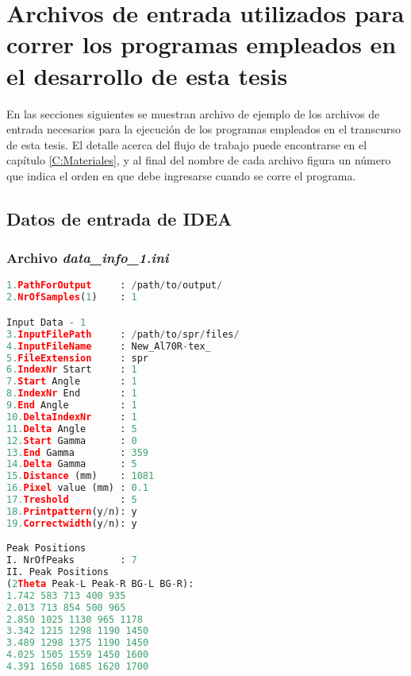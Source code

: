 \chapter{Archivos de entrada utilizados para correr los programas empleados en el desarrollo de esta tesis}\label{CA:input}
\graphicspath{{figs/Apendice}}
En las secciones siguientes se muestran archivo de ejemplo de los archivos de entrada necesarios para la ejecución de los programas empleados en el transcurso de esta tesis.
El detalle acerca del flujo de trabajo puede encontrarse en el capítulo \ref{C:Materiales}, y al final del nombre de cada archivo figura un número que indica el orden en que debe ingresarse cuando se corre el programa.
\section{Datos de entrada de IDEA}
\subsection{Archivo \textit{data\_info\_1.ini}}
\begin{lstlisting}[language=Python]
1.PathForOutput     : /path/to/output/
2.NrOfSamples(1)    : 1

Input Data - 1
3.InputFilePath     : /path/to/spr/files/
4.InputFileName     : New_Al70R-tex_
5.FileExtension     : spr
6.IndexNr Start     : 1
7.Start Angle       : 1
8.IndexNr End       : 1
9.End Angle         : 1
10.DeltaIndexNr     : 1
11.Delta Angle      : 5
12.Start Gamma      : 0
13.End Gamma        : 359
14.Delta Gamma      : 5
15.Distance (mm)    : 1081
16.Pixel value (mm) : 0.1
17.Treshold         : 5
18.Printpattern(y/n): y
19.Correctwidth(y/n): y

Peak Positions
I. NrOfPeaks        : 7
II. Peak Positions
(2Theta Peak-L Peak-R BG-L BG-R):
1.742 583 713 400 935
2.013 713 854 500 965
2.850 1025 1130 965 1178
3.342 1215 1298 1190 1450
3.489 1298 1375 1190 1450
4.025 1505 1559 1450 1600
4.391 1650 1685 1620 1700
\end{lstlisting}


